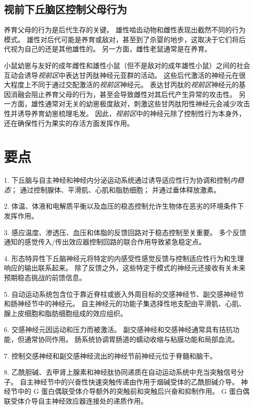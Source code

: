 \subsection{视前下丘脑区控制父母行为}

养育父母的行为是后代生存的关键。
雄性啮齿动物和雌性表现出截然不同的行为模式。
雄性对后代可能是养育或敌对，甚至到了杀婴的地步，这取决于它们将后代视为自己的还是其他雄性的。
另一方面，雌性老鼠通常是在养育。


小鼠幼崽与友好的成年雌性和雄性小鼠（但不是敌对的成年雄性小鼠）之间的社会互动会诱导\textit{视前区}中表达甘丙肽神经元亚群的活动。
这些后代激活的神经元在很大程度上不同于通过交配激活的\textit{视前区}神经元。
表达甘丙肽的\textit{视前区}神经元的基因消融会阻止养育父母的行为，甚至会导致雌性对其后代产生异常的攻击性。
另一方面，雄性通常对无关的幼崽极度敌对，刺激这些甘丙肽阳性神经元会减少攻击性并诱导养育幼崽梳理毛发。
因此，\textit{视前区}中的神经元除了控制性行为本身外，还在确保性行为果实的存活方面发挥作用。



\section{要点}

1. 下丘脑与自主神经和神经内分泌运动系统通过诱导适应性行为协调和控制\textit{内稳态}；
通过控制腺体、平滑肌、心肌和脂肪细胞；
并通过垂体释放激素。 


2. 体温、体液和电解质平衡以及血压的稳态控制允许生物体在恶劣的环境条件下发挥作用。


3. 感应温度、渗透压、血压和体脂的反馈回路对于稳态控制至关重要。
多个反馈通知的感觉传入/传出效应器控制回路的联合作用导致紧急稳定点。


4. 形态特异性下丘脑神经元将特定的内感受性感觉反馈与控制适应性行为和生理响应的输出联系起来。
除了反馈之外，这些特定于模式的神经元还接收有关未来预期稳态挑战的前馈信息。


5. 自动运动系统包含位于靠近脊柱或嵌入外周目标的交感神经节、副交感神经节和肠神经节中的神经元。
自主神经元的功能子集选择性地支配由平滑肌、心肌、腺上皮细胞和脂肪细胞组成的效应组织。


6. 交感神经元因运动和压力而被激活。
副交感神经和交感神经通常具有拮抗功能，但通常协同作用。
肠系统协调胃肠道的蠕动收缩与粘膜功能和局部血流。


7. 控制交感神经和副交感神经流出的神经节前神经元位于脊髓和脑干。


8. 乙酰胆碱、去甲肾上腺素和神经肽协同递质在自动运动系统中充当突触信号分子。
自主神经节中的兴奋性快速突触传递由作用于烟碱受体的乙酰胆碱介导。
神经节中的 G 蛋白偶联受体介导额外的突触前和突触后兴奋和抑制作用。
G 蛋白偶联受体介导自主神经效应器连接处的递质作用。


